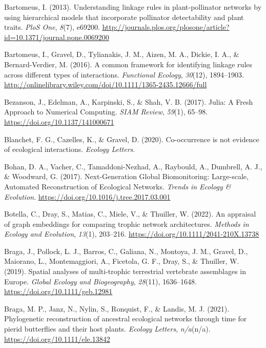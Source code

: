 \documentclass[10pt,oneside]{article}
\newlength{\cslhangindent}
\newenvironment{CSLReferences}[2] %
 {%
  \setlength{\parindent}{0pt}
  \ifodd #1 \everypar{\setlength{\hangindent}{\cslhangindent}}\ignorespaces\fi
  \ifnum #2 > 0
  \setlength{\parskip}{#2\baselineskip}
  \fi
 }%
 {}
\begin{document}
\begin{CSLReferences}{1}{0}
\leavevmode{}%
Bartomeus, I. (2013). Understanding linkage rules in plant-pollinator
networks by using hierarchical models that incorporate pollinator
detectability and plant traits. \emph{PloS One}, \emph{8}(7), e69200.
\url{http://journals.plos.org/plosone/article?id=10.1371/journal.pone.0069200}

\leavevmode{}%
Bartomeus, I., Gravel, D., Tylianakis, J. M., Aizen, M. A., Dickie, I.
A., \& Bernard-Verdier, M. (2016). A common framework for identifying
linkage rules across different types of interactions. \emph{Functional
Ecology}, \emph{30}(12), 1894--1903.
\url{http://onlinelibrary.wiley.com/doi/10.1111/1365-2435.12666/full}

\leavevmode{}%
Bezanson, J., Edelman, A., Karpinski, S., \& Shah, V. B. (2017). Julia:
A Fresh Approach to Numerical Computing. \emph{SIAM Review},
\emph{59}(1), 65--98. \url{https://doi.org/10.1137/141000671}

\leavevmode{}%
Blanchet, F. G., Cazelles, K., \& Gravel, D. (2020). Co-occurrence is
not evidence of ecological interactions. \emph{Ecology Letters}.

\leavevmode{}%
Bohan, D. A., Vacher, C., Tamaddoni-Nezhad, A., Raybould, A., Dumbrell,
A. J., \& Woodward, G. (2017). Next-Generation Global Biomonitoring:
Large-scale, Automated Reconstruction of Ecological Networks.
\emph{Trends in Ecology \& Evolution}.
\url{https://doi.org/10.1016/j.tree.2017.03.001}

\leavevmode{}%
Botella, C., Dray, S., Matias, C., Miele, V., \& Thuiller, W. (2022). An
appraisal of graph embeddings for comparing trophic network
architectures. \emph{Methods in Ecology and Evolution}, \emph{13}(1),
203--216. \url{https://doi.org/10.1111/2041-210X.13738}

\leavevmode{}%
Braga, J., Pollock, L. J., Barros, C., Galiana, N., Montoya, J. M.,
Gravel, D., Maiorano, L., Montemaggiori, A., Ficetola, G. F., Dray, S.,
\& Thuiller, W. (2019). Spatial analyses of multi-trophic terrestrial
vertebrate assemblages in Europe. \emph{Global Ecology and
Biogeography}, \emph{28}(11), 1636--1648.
\url{https://doi.org/10.1111/geb.12981}

\leavevmode{}%
Braga, M. P., Janz, N., Nylin, S., Ronquist, F., \& Landis, M. J.
(2021). Phylogenetic reconstruction of ancestral ecological networks
through time for pierid butterflies and their host plants. \emph{Ecology
Letters}, \emph{n/a}(n/a). \url{https://doi.org/10.1111/ele.13842}


\end{CSLReferences}
\end{document}
